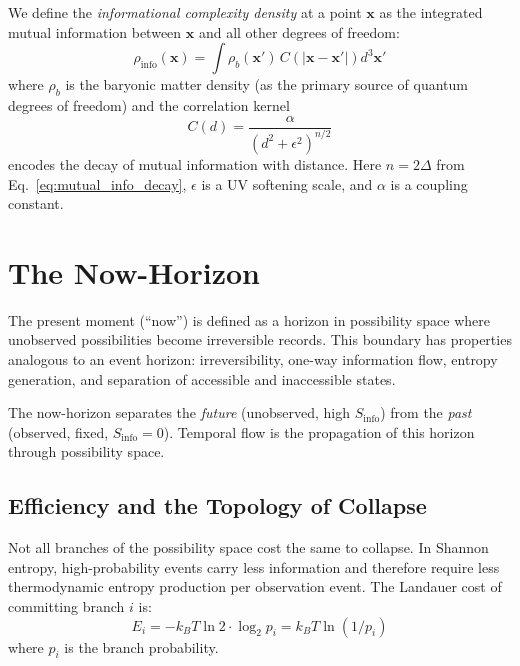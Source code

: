 \documentclass[12pt,a4paper]{article}
\begin{document}
We define the \emph{informational complexity density} at a point $\mathbf{x}$ as the integrated mutual information between $\mathbf{x}$ and all other degrees of freedom:
\begin{equation}
    \rho_{\mathrm{info}}(\mathbf{x}) = \int \rho_b(\mathbf{x}') \, C\!\left(|\mathbf{x} - \mathbf{x}'|\right) d^3\mathbf{x}'
    \label{eq:rho_info}
\end{equation}
where $\rho_b$ is the baryonic matter density (as the primary source of quantum degrees of freedom) and the correlation kernel
\begin{equation}
    C(d) = \frac{\alpha}{(d^2 + \epsilon^2)^{n/2}}
    \label{eq:kernel}
\end{equation}
encodes the decay of mutual information with distance. Here $n = 2\Delta$ from Eq.~\eqref{eq:mutual_info_decay}, $\epsilon$ is a UV softening scale, and $\alpha$ is a coupling constant.

\section{The Now-Horizon}
\label{sec:nowhorizon}

The present moment (``now'') is defined as a horizon in possibility space where unobserved possibilities become irreversible records. This boundary has properties analogous to an event horizon: irreversibility, one-way information flow, entropy generation, and separation of accessible and inaccessible states.

The now-horizon separates the \emph{future} (unobserved, high $S_{\mathrm{info}}$) from the \emph{past} (observed, fixed, $S_{\mathrm{info}} = 0$). Temporal flow is the propagation of this horizon through possibility space.

\subsection{Efficiency and the Topology of Collapse}

Not all branches of the possibility space cost the same to collapse. In Shannon entropy, high-probability events carry less information and therefore require less thermodynamic entropy production per observation event. The Landauer cost of committing branch $i$ is:
\begin{equation}
    E_i = -k_B T \ln 2 \cdot \log_2 p_i = k_B T \ln(1/p_i)
\end{equation}
where $p_i$ is the branch probability.
\end{document}
